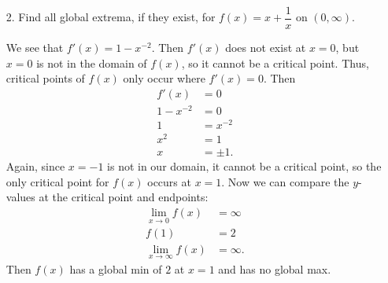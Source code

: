 \documentclass[11pt]{article}
\begin{document}
\newsavebox{\quizback}
\begin{lrbox}{\quizback}
\begin{minipage}[top][5.5in][t]{\textwidth} \setlength{\parindent}{1.5em}
\begin{enumerate}
\item[2.] Find all global extrema, if they exist, for $f(x) = x +
  \dfrac{1}{x}$ on $(0, \infty)$.
 
  \vfill
  {\color{blue}

    We see that $f'(x) = 1-x^{-2}$. Then $f'(x)$ does not exist at $x
    = 0$, but $x=0$ is not in the domain of $f(x)$, so it cannot be a
    critical point. Thus, critical points of $f(x)$ only occur where
    $f'(x) = 0$. Then
    \begin{align*}
      f'(x) &= 0\\
      1-x^{-2} & = 0\\
      1 &= x^{-2}\\
      x^2 &= 1\\
      x &= \pm 1.
    \end{align*}
    Again, since $x=-1$ is not in our domain, it cannot be a critical
    point, so the only critical point for $f(x)$ occurs at $x =
    1$. Now we can compare the $y$-values at the critical point and
    endpoints:
    \begin{align*}
      \lim_{x\to 0} f(x) &= \infty\\
      f(1) &= 2\\
      \lim_{x\to\infty} f(x) &= \infty.
    \end{align*}
    Then $f(x)$ has a global min of $2$ at $x=1$ and has no global
    max.

  }
  \vfill

\end{enumerate}
\end{minipage}
\end{lrbox}

\noindent \usebox{\quizfront}
\vfill
\noindent \usebox{\quizback}

\end{document}
